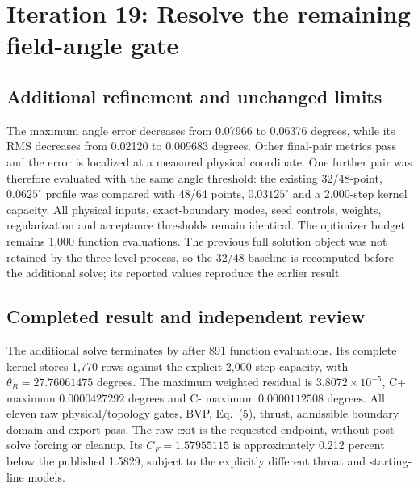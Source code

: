 \section{Iteration 19: Resolve the remaining field-angle gate}
\subsection{Additional refinement and unchanged limits}
The maximum angle error decreases from 0.07966 to 0.06376 degrees, while
its RMS decreases from 0.02120 to 0.009683 degrees. Other final-pair
metrics pass and the error is localized at a measured physical coordinate.
One further pair was therefore evaluated with the same angle
threshold: the existing 32/48-point, $0.0625^\circ$ profile was compared with
48/64 points, $0.03125^\circ$ and a 2,000-step kernel capacity.
All physical inputs, exact-boundary modes, seed controls, weights,
regularization and acceptance thresholds remain identical. The optimizer
budget remains 1,000 function evaluations. The previous full solution object
was not retained by the three-level process, so the 32/48 baseline is
recomputed before the additional solve; its reported values reproduce the
earlier result.

\subsection{Completed result and independent review}
The additional solve terminates by  after 891 function
evaluations. Its complete kernel stores 1,770 rows against the explicit
2,000-step capacity, with $\theta_B=27.76061475$ degrees. The maximum
weighted residual is $3.8072\times10^{-5}$, C+ maximum
$0.0000427292$ degrees and C- maximum $0.0000112508$ degrees.
All eleven raw physical/topology gates, BVP, Eq.~(5), thrust, admissible
boundary domain and export pass. The raw exit is the requested endpoint,
without post-solve forcing or cleanup. Its $C_F=1.57955115$ is approximately
0.212 percent below the published 1.5829, subject to the explicitly
different throat and starting-line models.

